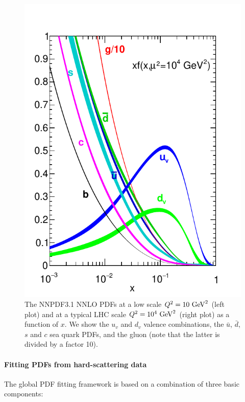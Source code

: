 \begin{figure}[t]
\begin{center}
  \includegraphics[scale=0.75]{plots/nnpdf31nnlo-1e4.pdf}
  \caption{\small The NNPDF3.1 NNLO PDFs at a low scale
    $Q^2=10~{\rm GeV}^2$ (left plot) and at a typical LHC scale
    $Q^2=10^4~{\rm GeV}^2$ (right plot) as a function of $x$.
    We show the $u_v$ and $d_v$ valence combinations, the $\bar{u}$,
    $\bar{d}$, $s$ and $c$ sea quark PDFs, and the gluon (note that
    the latter is divided by a factor 10).
    \label{fig:nnlopdfs}
  }
\end{center}
\end{figure}

\paragraph*{Fitting PDFs from hard-scattering data}
%
The global PDF fitting framework is based on a combination of three basic components:

